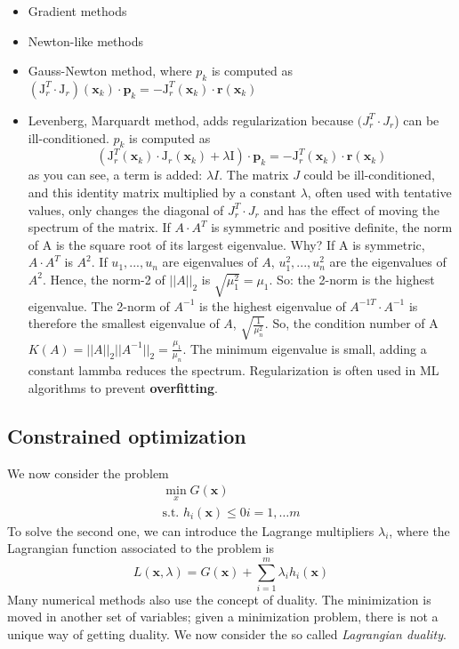 \documentclass[11pt]{article}
\begin{document}
\begin{itemize}
    \item Gradient methods
    \item Newton-like methods
    \item Gauss-Newton method, where $p_k$ is computed as $\left(\mathrm{J}_{r}^{T} \cdot \mathrm{J}_{r}\right)\left(\mathbf{x}_{k}\right) \cdot \mathbf{p}_{k}=-\mathrm{J}_{r}^{T}\left(\mathbf{x}_{k}\right) \cdot \mathbf{r}\left(\mathbf{x}_{k}\right)$
    \item Levenberg, Marquardt method, adds regularization because $(J^T_r \cdot J_r$) can be ill-conditioned. $p_k$ is computed as \begin{displaymath}
        \left(\mathrm{J}_{r}^{T}\left(\mathbf{x}_{k}\right) \cdot \mathrm{J}_{r}\left(\mathbf{x}_{k}\right)+\lambda \mathrm{I}\right) \cdot \mathbf{p}_{k}=-\mathrm{J}_{r}^{T}\left(\mathbf{x}_{k}\right) \cdot \mathbf{r}\left(\mathbf{x}_{k}\right)
    \end{displaymath}
    as you can see, a term is added: $\lambda I$. The matrix $J$ could be ill-conditioned, and this identity matrix multiplied by a constant $\lambda$, often used with tentative values, only changes the diagonal of $J_r^T \cdot J_r$ and has the effect of moving the spectrum of the matrix. If $A \cdot A^T$ is symmetric and positive definite, the norm of A is the square root of its largest eigenvalue. Why? If A is symmetric, $A\cdot A^T$ is $A^2$. If $u_1,...,u_n$ are eigenvalues of $A$, $u_1^2, ...,u_n^2$ are the eigenvalues of $A^2$. Hence, the norm-2 of $||A||_2$ is $\sqrt{\mu_1^2}=\mu_1$. So: the 2-norm is the highest eigenvalue. The 2-norm of $A^{-1}$ is the highest eigenvalue of $A^{-1T}\cdot A^{-1}$ is therefore the smallest eigenvalue of $A$, $\sqrt{\frac{1}{\mu_n^2}}$. So, the condition number of A $K(A)=||A||_2 ||A^{-1}||_2 = \frac{\mu_1}{\mu_n}$. The minimum eigenvalue is small, adding a constant lammba reduces the spectrum. Regularization is often used in ML algorithms to prevent \textbf{overfitting}.  
\end{itemize}
\subsection{Constrained optimization}
We now consider the problem 
\begin{displaymath}
    \begin{array}{c}
        \min _{x} G(\mathbf{x}) \\
        \text {s.t. } h_{i}(\mathbf{x}) \leq 0 i=1, \ldots m
        \end{array}
\end{displaymath}
To solve the second one, we can introduce the Lagrange multipliers $\lambda_i$, where the Lagrangian function associated to the problem is \begin{displaymath}
    L(\mathbf{x}, \lambda)=G(\mathbf{x})+\sum_{i=1}^{m} \lambda_{i} h_{i}(\mathbf{x})
\end{displaymath}
Many numerical methods also use the concept of duality. The minimization is moved in another set of variables; given a minimization problem, there is not a unique way of getting duality. We now consider the so called \textit{Lagrangian duality}.
\end{document}
